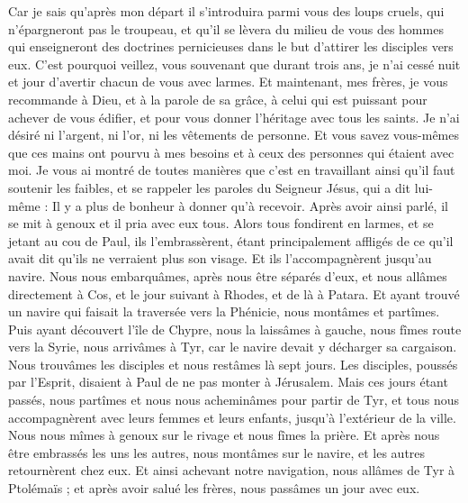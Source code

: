 \begin{multicols}{2}
Car je sais qu'après mon départ il s’introduira parmi vous des loups cruels, qui n'épargneront pas le troupeau,
et qu'il se lèvera du milieu de vous des hommes qui enseigneront des doctrines pernicieuses dans le but d'attirer les disciples vers eux.
C'est pourquoi veillez, vous souvenant que durant trois ans, je n'ai cessé nuit et jour d'avertir chacun de vous avec larmes.
Et maintenant, mes frères, je vous recommande à Dieu, et à la parole de sa grâce, à celui qui est puissant pour achever de vous édifier, et pour vous donner l'héritage avec tous les saints.
Je n'ai désiré ni l'argent, ni l'or, ni les vêtements de personne.
Et vous savez vous-mêmes que ces mains ont pourvu à mes besoins et à ceux des personnes qui étaient avec moi.
Je vous ai montré de toutes manières que c’est en travaillant ainsi qu’il faut soutenir les faibles, et se rappeler les paroles du Seigneur Jésus, qui a dit lui-même : Il y a plus de bonheur à donner qu’à recevoir.
Après avoir ainsi parlé, il se mit à genoux et il pria avec eux tous.
Alors tous fondirent en larmes, et se jetant au cou de Paul,
ils l’embrassèrent, étant principalement affligés de ce qu’il avait dit qu’ils ne verraient plus son visage. Et ils l’accompagnèrent jusqu’au navire.
\VerseOne{}Nous nous embarquâmes, après nous être séparés d’eux, et nous allâmes directement à Cos, et le jour suivant à Rhodes, et de là à Patara.
Et ayant trouvé un navire qui faisait la traversée vers la Phénicie, nous montâmes et partîmes.
Puis ayant découvert l’île de Chypre, nous la laissâmes à gauche, nous fîmes route vers la Syrie, nous arrivâmes à Tyr, car le navire devait y décharger sa cargaison.
Nous trouvâmes les disciples et nous restâmes là sept jours. Les disciples, poussés par l'Esprit, disaient à Paul de ne pas monter à Jérusalem.
Mais ces jours étant passés, nous partîmes et nous nous acheminâmes pour partir de Tyr, et tous nous accompagnèrent avec leurs femmes et leurs enfants, jusqu’à l’extérieur de la ville. Nous nous mîmes à genoux sur le rivage et nous fîmes la prière.
Et après nous être embrassés les uns les autres, nous montâmes sur le navire, et les autres retournèrent chez eux.
Et ainsi achevant notre navigation, nous allâmes de Tyr à Ptolémaïs ; et après avoir salué les frères, nous passâmes un jour avec eux.

\end{multicols}
